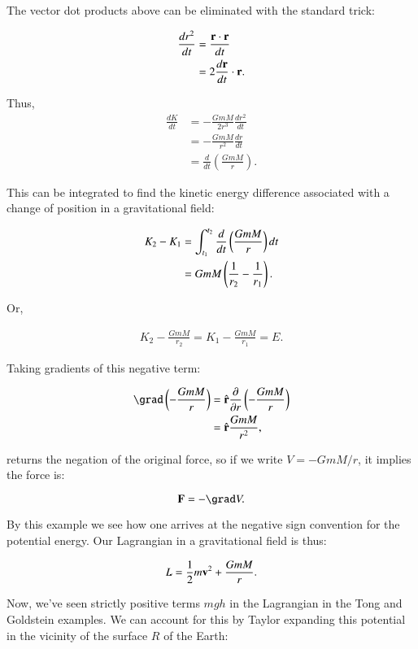 The vector dot products above can be eliminated with the standard trick:

\begin{align*}
\frac{dr^2}{dt} 
&= \frac{\mathbf{r} \cdot \mathbf{r}}{dt} \\
&= 2 \frac{d\mathbf{r}}{dt} \cdot \mathbf{r}.
\end{align*}

Thus,
\begin{align*}
\frac{dK}{dt} 
&= -\frac{GmM }{2r^3} \frac{dr^2}{dt} \\
&= -\frac{GmM }{r^2} \frac{dr}{dt} \\
&= \frac{d}{dt} \left( \frac{GmM }{r} \right).
\end{align*}

This can be integrated to find the kinetic energy difference associated with a change of position in a gravitational field:

\begin{align*}
K_2 - K_1 
&= \int_{t_1}^{t_2} \frac{d}{dt} \left( \frac{GmM }{r} \right) dt \\
&= GmM \left( \frac{1}{r_2} - \frac{1}{r_1} \right).
\end{align*}

Or, 

\begin{align*}
K_2 - \frac{GmM}{r_2} = K_1 - \frac{GmM}{r_1} = E.
\end{align*}

Taking gradients of this negative term:

\begin{align*}
\grad \left( - \frac{GmM}{r} \right)
&= \rcap \frac{\partial}{\partial r} \left( - \frac{GmM}{r} \right) \\
&= \rcap \frac{GmM}{r^2},
\end{align*}

returns the negation of the original force, so if we write $V = -GmM/r$, it implies the force is:

\begin{equation}
\BF = -\grad V.
\end{equation}

By this example we see how one arrives at the negative sign convention for the potential energy.  Our 
Lagrangian in a gravitational field is thus:

\begin{equation}
L = \frac{1}{2} m \mathbf{v}^2 + \frac{GmM}{r}.
\end{equation}

Now, we've seen strictly positive terms $mgh$ in the Lagrangian in the Tong and Goldstein examples.  We can account for this by
Taylor expanding this potential in the vicinity of the surface $R$ of the Earth:

